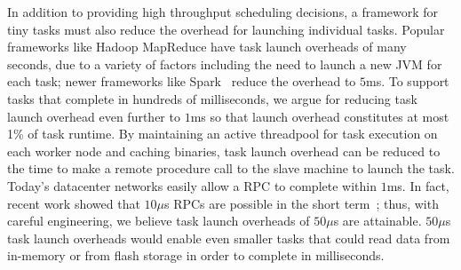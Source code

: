 In addition to providing high throughput scheduling decisions, a framework for
tiny tasks must also reduce the overhead for launching individual tasks.
Popular frameworks like Hadoop MapReduce have task launch overheads of many
seconds, due to a variety of factors including the need to launch a new
JVM for each task; newer frameworks like Spark~\cite{zaharia2010spark} reduce
the overhead to $5$ms.
To support tasks that complete in hundreds of milliseconds, we argue for
reducing task launch overhead even further to $1$ms so that launch overhead
constitutes at most 1\% of task runtime.
By maintaining an active threadpool for task execution on each worker node
and caching binaries, task launch overhead can be reduced to the time to
make
 a remote procedure
call to the slave machine to launch the task. Today's datacenter networks
easily allow a RPC to complete within $1$ms. In fact, recent work showed that
$10\mu$s RPCs are possible in the short term~\cite{low-latency}; thus,
with careful engineering, we believe task launch overheads of $50\mu$s are
attainable. $50\mu$s task launch overheads would enable even smaller tasks
that could read data from in-memory or from flash storage in order to complete
in milliseconds.
